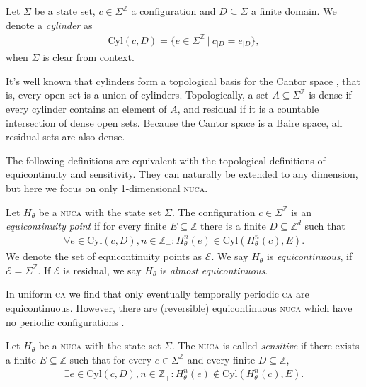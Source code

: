 \documentclass[runningheads]{llncs}
\newcommand{\Z}{\mathbb{Z}}
\newcommand{\set}[2]{\{ #1 \: | \: #2 \}}
\begin{document}
\begin{definition}
Let $\Sigma$ be a state set, $c \in \Sigma^\Z$ a configuration and $D \subseteq \Sigma$ a finite domain. We denote a \emph{cylinder} as
\begin{align*}
\mathrm{Cyl} (c,D) = \set{e \in \Sigma^\Z}{c_{|D} = e_{|D}},
\end{align*}
when $\Sigma$ is clear from context.
\end{definition}

It's well known that cylinders form a topological basis for the Cantor space \cite{kari}, that is, every open set is a union of cylinders. Topologically, a set $A\subseteq \Sigma^\Z$ is dense if every cylinder contains an element of $A$, and residual if it is a countable intersection of dense open sets. Because the Cantor space is a Baire space, all residual sets are also dense. %

The following definitions are equivalent with the topological definitions of equicontinuity and sensitivity. They can naturally be extended to any dimension, but here we focus on only 1-dimensional \textsc{nuca}.

\begin{definition}
Let $H_\theta$ be a \textsc{nuca} with the state set $\Sigma$. The configuration $c \in \Sigma^\Z$ is an \emph{equicontinuity point} if for every finite $E \subseteq \Z$ there is a finite $D\subseteq \Z^d$ such that
\begin{align*}
\forall  e \in \mathrm{Cyl}(c,D)  , n\in \Z_+: H_\theta^n (e) \in \mathrm{Cyl}(H_\theta^n(c),E).
\end{align*}
We denote the set of equicontinuity points as $\mathcal{E}$. We say $H_\theta$ is \emph{equicontinuous}, if $\mathcal{E} = \Sigma^\Z$. If $\mathcal{E}$ is residual, we say $H_\theta$ is \emph{almost equicontinuous}.
\end{definition}

In uniform \textsc{ca} we find that only eventually temporally periodic \textsc{ca} are equicontinuous. However, there are (reversible) equicontinuous \textsc{nuca} which have no periodic configurations \cite{kamilya}.

\begin{definition}
Let $H_\theta$ be a \textsc{nuca} with the state set $\Sigma$. The \textsc{nuca} is called \emph{sensitive} if there exists a finite $E\subseteq \Z$ such that for every $c \in \Sigma^\Z$ and every finite $D \subseteq \Z$,
\begin{align*}
\exists  e\in \mathrm{Cyl} (c,D),n \in \Z_+ :  H_\theta^n (e) \notin \mathrm{Cyl}(H_\theta^n(c),E).
\end{align*}
\end{definition}
\end{document}

